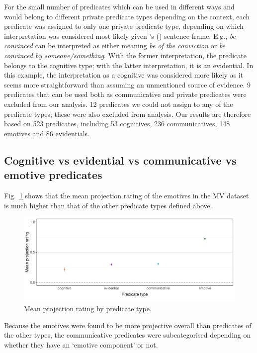 \documentclass[11pt,fleqn]{article}
\newcommand{\figref}[1]{Fig.~\ref{#1}}
\newcommand{\6}{\mbox{$[\hspace*{-.6mm}[$}}
\newcommand{\9}{\mbox{$]\hspace*{-.6mm}]$}}
\newcommand{\citepos}[1]{\citeauthor{#1}'s (\citeyear{#1})}
\begin{document}
For the small number of predicates which can be used in different ways and would belong to different private predicate types depending on the context, each predicate was assigned to only one private predicate type, depending on which interpretation was considered most likely given \citepos{white-rawlins-nels2018} sentence frame. E.g., \emph{be convinced} can be interpreted as either meaning \emph{be of the conviction} or \emph{be convinced by someone/something}. With the former interpretation, the predicate belongs to the cognitive type; with the latter interpretation, it is an evidential. In this example, the interpretation as a cognitive was considered more likely as it seems more straightforward than assuming an unmentioned source of evidence. 9 predicates that can be used both as communicative and private predicates were excluded from our analysis. 12 predicates we could not assign to any of the predicate types; these were also excluded from analysis. Our results are therefore based on 523 predicates, including 53 cognitives, 236 communicatives, 148 emotives and 86 evidentials.

\subsection{Cognitive vs evidential vs communicative vs emotive predicates}

\figref{projpredtype} shows that the mean projection rating of the emotives in the MV dataset is much higher than that of the other predicate types defined above.

\begin{figure}[H]
	\centering
	\includegraphics[width=1\textwidth]{projection-by-predicateType}
	\caption{Mean projection rating by predicate type.}
	\label{projpredtype}
\end{figure}

Because the emotives were found to be more projective overall than predicates of the other types, the communicative predicates were subcategorised depending on whether they have an `emotive component' or not. 
\end{document}
